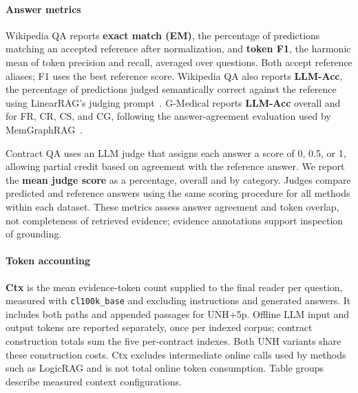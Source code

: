 \documentclass[sigconf, review, anonymous]{acmart}
\newcommand{\sys}{UNH}
\begin{document}
\paragraph{Answer metrics}
Wikipedia QA reports \textbf{exact match (EM)}, the percentage of predictions matching an accepted reference after normalization, and \textbf{token F1}, the harmonic mean of token precision and recall, averaged over questions. Both accept reference aliases; F1 uses the best reference score. Wikipedia QA also reports \textbf{LLM-Acc}, the percentage of predictions judged semantically correct against the reference using LinearRAG's judging prompt~\cite{zhuang2025linearrag}. G-Medical reports \textbf{LLM-Acc} overall and for FR, CR, CS, and CG, following the answer-agreement evaluation used by MemGraphRAG~\cite{wu2026memgraphrag}.

Contract QA uses an LLM judge that assigns each answer
a score of 0, 0.5, or 1, allowing partial credit based on
agreement with the reference answer. We report the
\textbf{mean judge score} as a percentage, overall and
by category. Judges compare predicted and reference answers using the same scoring procedure for all methods within each dataset. These metrics assess answer agreement and token overlap, not completeness of retrieved evidence; evidence annotations support inspection of grounding.

\paragraph{Token accounting}
\textbf{Ctx} is the mean evidence-token count supplied to the final reader per question, measured with \texttt{cl100k\_base} and excluding instructions and generated answers. It includes both paths and appended passages for \sys{}+5p. Offline LLM input and output tokens are reported separately, once per indexed corpus; contract construction totals sum the five per-contract indexes. Both \sys{} variants share these construction costs. Ctx excludes intermediate online calls used by methods such as LogicRAG and is not total online token consumption. Table groups describe measured context configurations.

\end{document}
